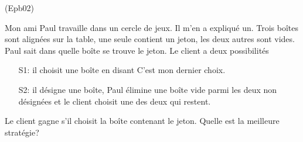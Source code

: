 \begin{tiny}(Epb02)\end{tiny} Mon ami Paul travaille dans un cercle de jeux. Il m'en a expliqué un. Trois boîtes sont alignées sur la table, une seule contient un jeton, les deux autres sont vides. Paul sait dans quelle boîte se trouve le jeton. Le client a deux possibilités
\begin{itemize}
 \item[S1:] il choisit une boîte en disant \og C'est mon dernier choix\fg.
 \item[S2:] il désigne une boîte, Paul élimine une boîte vide parmi les deux non désignées et le client choisit une des deux qui restent.
\end{itemize}
Le client gagne s'il choisit la boîte contenant le jeton. Quelle est la meilleure stratégie?  